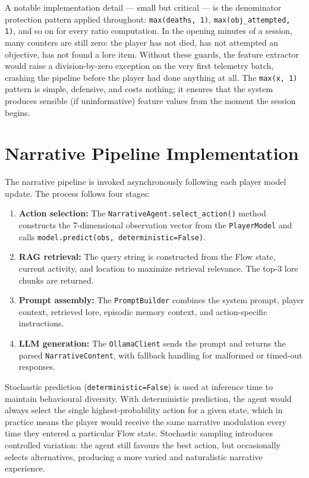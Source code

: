 A notable implementation detail --- small but critical --- is the denominator protection pattern applied throughout: \texttt{max(deaths, 1)}, \texttt{max(obj\_attempted, 1)}, and so on for every ratio computation. In the opening minutes of a session, many counters are still zero: the player has not died, has not attempted an objective, has not found a lore item. Without these guards, the feature extractor would raise a division-by-zero exception on the very first telemetry batch, crashing the pipeline before the player had done anything at all. The \texttt{max(x, 1)} pattern is simple, defensive, and costs nothing; it ensures that the system produces sensible (if uninformative) feature values from the moment the session begins.

\section{Narrative Pipeline Implementation}

The narrative pipeline is invoked asynchronously following each player model update. The process follows four stages:

\begin{enumerate}
\item \textbf{Action selection:} The \texttt{NarrativeAgent.select\_action()} method constructs the 7-dimensional observation vector from the \texttt{PlayerModel} and calls \texttt{model.predict(obs, deterministic=False)}.
\item \textbf{RAG retrieval:} The query string is constructed from the Flow state, current activity, and location to maximize retrieval relevance. The top-3 lore chunks are returned.
\item \textbf{Prompt assembly:} The \texttt{PromptBuilder} combines the system prompt, player context, retrieved lore, episodic memory context, and action-specific instructions.
\item \textbf{LLM generation:} The \texttt{OllamaClient} sends the prompt and returns the parsed \texttt{NarrativeContent}, with fallback handling for malformed or timed-out responses.
\end{enumerate}

Stochastic prediction (\texttt{deterministic=False}) is used at inference time to maintain behavioural diversity. With deterministic prediction, the agent would always select the single highest-probability action for a given state, which in practice means the player would receive the same narrative modulation every time they entered a particular Flow state. Stochastic sampling introduces controlled variation: the agent still favours the best action, but occasionally selects alternatives, producing a more varied and naturalistic narrative experience.


